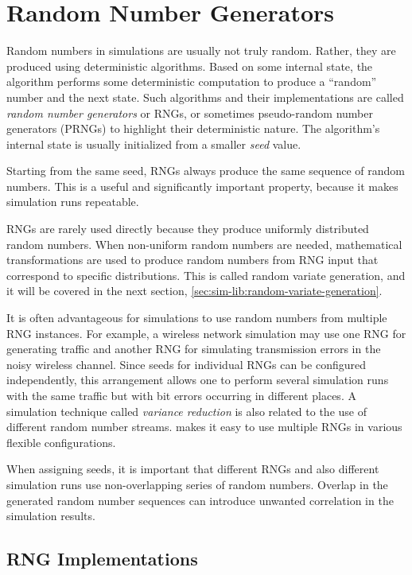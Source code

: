 \section{Random Number Generators}
\label{sec:sim-lib:random-number-generators}

Random numbers in simulations are usually not truly random. Rather, they
are produced using deterministic algorithms. Based on some internal state,
the algorithm performs some deterministic computation to produce a
``random'' number and the next state. Such algorithms and their
implementations are called \textit{random number generators} or RNGs, or
sometimes pseudo-random number generators (PRNGs) to highlight their
deterministic nature. The algorithm's internal state is usually initialized
from a smaller \textit{seed} value.

Starting from the same seed, RNGs always produce the same sequence of
random numbers. This is a useful and significantly important property,
because it makes simulation runs repeatable.

RNGs are rarely used directly because they produce uniformly distributed
random numbers. When non-uniform random numbers are needed, mathematical
transformations are used to produce random numbers from RNG input that
correspond to specific distributions. This is called random variate
generation, and it will be covered in the next section,
\ref{sec:sim-lib:random-variate-generation}.

It is often advantageous for simulations to use random numbers from
multiple RNG instances. For example, a wireless network simulation may use
one RNG for generating traffic and another RNG for simulating transmission
errors in the noisy wireless channel. Since seeds for individual RNGs can
be configured independently, this arrangement allows one to perform
several simulation runs with the same traffic but with bit errors occurring
in different places. A simulation technique called \textit{variance
reduction} is also related to the use of different random number streams.
{\opp} makes it easy to use multiple RNGs in various flexible configurations.

When assigning seeds, it is important that different RNGs and also
different simulation runs use non-overlapping series of random numbers.
Overlap in the generated random number sequences can introduce unwanted
correlation in the simulation results.

\subsection{RNG Implementations}
\label{sec:sim-lib:rngs}

